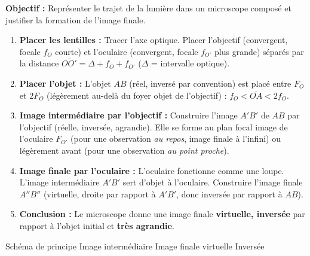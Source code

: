 \documentclass[11pt]{article}
\newcommand{\cle}[1]{{\popxbold\color{popdark}#1}}
\begin{document}
\begin{methode}
\textbf{Objectif :} Représenter le trajet de la lumière dans un microscope composé et justifier la formation de l'image finale.
\begin{enumerate}
    \item \textbf{Placer les lentilles :} Tracer l'axe optique. Placer l'objectif (convergent, focale $f_O$ courte) et l'oculaire (convergent, focale $f_{O'}$ plus grande) séparés par la distance $\overline{OO'} = \Delta + f_O + f_{O'}$ ($\Delta$ = intervalle optique).
    \item \textbf{Placer l'objet :} L'objet $AB$ (réel, inversé par convention) est placé entre $F_O$ et $2F_O$ (légèrement au-delà du foyer objet de l'objectif) : $f_O < \overline{OA} < 2f_O$.
    \item \textbf{Image intermédiaire par l'objectif :} Construire l'image $A'B'$ de $AB$ par l'objectif (réelle, inversée, agrandie). Elle se forme au plan focal image de l'oculaire $F_{O'}$ (pour une observation \emph{au repos}, image finale à l'infini) ou légèrement avant (pour une observation \emph{au point proche}).
    \item \textbf{Image finale par l'oculaire :} L'oculaire fonctionne comme une loupe. L'image intermédiaire $A'B'$ sert d'objet à l'oculaire. Construire l'image finale $A''B''$ (virtuelle, droite par rapport à $A'B'$, donc inversée par rapport à $AB$).
    \item \textbf{Conclusion :} Le microscope donne une image finale \textbf{virtuelle, inversée} par rapport à l'objet initial et \textbf{très agrandie}.
\end{enumerate}
\cle{Schéma de principe} \cle{Image intermédiaire} \cle{Image finale virtuelle} \cle{Inversée}
\end{methode}
\end{document}
